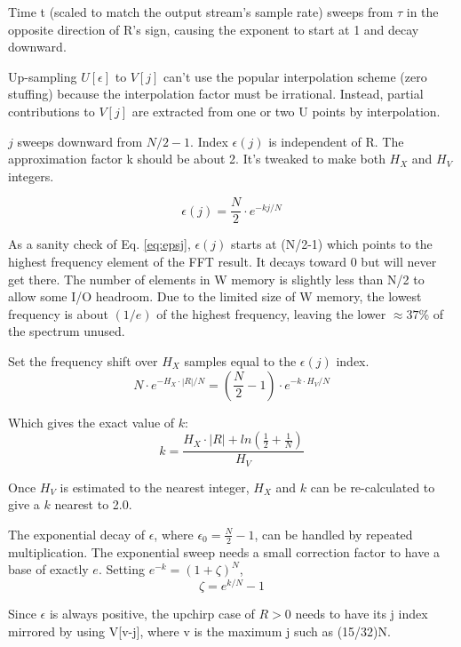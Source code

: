 Time t (scaled to match the output stream's sample rate) sweeps from $\tau$
in the opposite direction of R's sign,
causing the exponent to start at 1 and decay downward.

Up-sampling $U[\epsilon]$ to $V[j]$ can't use the popular interpolation scheme
(zero stuffing) because the interpolation factor must be irrational. Instead,
partial contributions to $V[j]$ are extracted from one or two U points by
interpolation.

$j$ sweeps downward from $N/2-1$. Index $\epsilon(j)$ is independent of R.
The approximation factor k should be about 2. 
It's tweaked to make both $H_X$ and $H_V$ integers.

\begin{equation}  \label{eq:epsj}
\epsilon(j) = \frac{N}{2} \cdot e^{-kj/N}
\end{equation}

As a sanity check of Eq. \ref{eq:epsj}, $\epsilon(j)$ starts at (N/2-1) which
points to the highest frequency element of the FFT result.
It decays toward 0 but will never get there.
The number of elements in W memory is slightly less than N/2 to allow some I/O
headroom. Due to the limited size of W memory,
the lowest frequency is about $(1/e)$ of the highest frequency,
leaving the lower $\approx37$\% of the spectrum unused.

Set the frequency shift over $H_X$ samples equal to the $\epsilon(j)$ index.
\begin{equation}
N\cdot e^{-H_X\cdot |R|/N} = \left(\frac{N}{2}-1\right)\cdot e^{-k \cdot H_V/N}
\end{equation}

Which gives the exact value of $k$:
\begin{equation} 
k = \frac{H_X \cdot |R| + ln\left(\frac{1}{2} + \frac{1}{N}\right)}{H_V}
\end{equation}

Once $H_V$ is estimated to the nearest integer, $H_X$ and $k$ can be
re-calculated to give a $k$ nearest to 2.0.

The exponential decay of $\epsilon$, where $\epsilon_0 = \frac{N}{2}-1$, can be
handled by repeated multiplication.
The exponential sweep needs a small correction factor to have a base of exactly
$e$.
Setting $e^{-k} = (1 + \zeta)^N$,
\begin{equation}
\zeta = e^{k/N} - 1
\end{equation}

Since $\epsilon$ is always positive, the upchirp case of $R>0$ needs to have its
j index mirrored by using V[v-j], where v is the maximum j such as (15/32)N.

